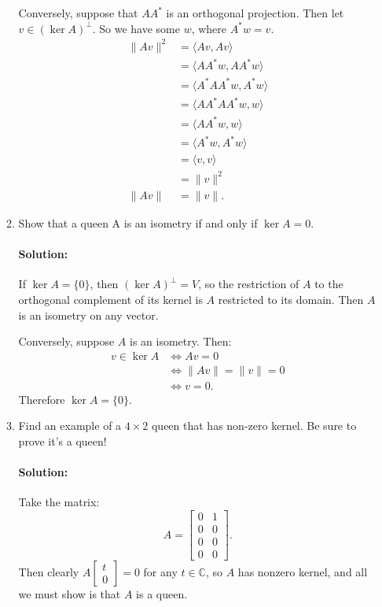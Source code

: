 \documentclass{article}
\begin{document}
\begin{enumerate}
\begin{enumerate}[label= (\alph*)]
    Conversely, suppose that $AA^*$ is an orthogonal projection. Then let $v\in (\ker A)^{\perp}$. So we have some $w$, where  $A^* w=v$.
    \begin{align*}
        \|Av\|^2&= \langle Av,Av \rangle \\
        &= \langle A A^* w,A A^* w \rangle \\
        &= \langle A^* A A^* w, A^* w \rangle \\
        &= \langle AA^* A A^* w,  w \rangle \\
        &= \langle  A A^* w,  w \rangle \\
        &= \langle   A^* w,  A^* w \rangle \\
        &= \langle   v, v \rangle \\
        &= \|v\|^2\\
        \|Av\|&=\|v\|
    .\end{align*}

\item Show that a queen A is an isometry if and only if $\ker A = {0}$.

    \paragraph{Solution: }If $\ker A=\{0\} $, then $(\ker A)^{\perp}=V$, so the restriction of $A$ to the orthogonal complement of its kernel is $A$ restricted to its domain. Then $A$ is an isometry on any vector.

    Conversely, suppose $A$ is an isometry. Then:
    \begin{align*}
        v\in \ker A&\iff Av=0\\
                   &\iff \|Av\|=\|v\|=0\\
                   &\iff v=0
    .\end{align*}
    Therefore $\ker A=\{0\} $. 

\item Find an example of a $4 \times  2$ queen that has non-zero kernel. Be sure to prove it's a queen!
    \paragraph{Solution: }Take the matrix:
    \[
        A=\begin{bmatrix} 0&1\\0&0\\ 0&0\\0&0  \end{bmatrix} 
    .\] 
    Then clearly $A\begin{bmatrix} t\\0 \end{bmatrix} =0$ for any $t\in \mathbb{C}$, so $A$ has nonzero kernel, and all we must show is that $A$ is a queen.


\end{enumerate}
\end{enumerate}
\end{document}
